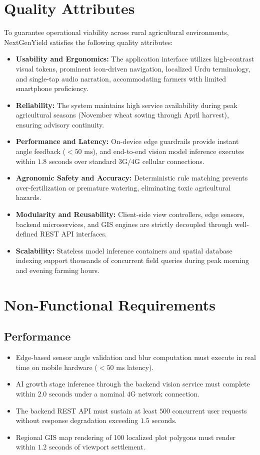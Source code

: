 \documentclass{FastFyp}
\begin{document}
\section{Quality Attributes}
To guarantee operational viability across rural agricultural environments, NextGenYield satisfies the following quality attributes:
\begin{itemize}
    \item \textbf{Usability and Ergonomics:} The application interface utilizes high-contrast visual tokens, prominent icon-driven navigation, localized Urdu terminology, and single-tap audio narration, accommodating farmers with limited smartphone proficiency.
    \item \textbf{Reliability:} The system maintains high service availability during peak agricultural seasons (November wheat sowing through April harvest), ensuring advisory continuity.
    \item \textbf{Performance and Latency:} On-device edge guardrails provide instant angle feedback ($< 50\text{ ms}$), and end-to-end vision model inference executes within $1.8\text{ seconds}$ over standard $3\text{G}/4\text{G}$ cellular connections.
    \item \textbf{Agronomic Safety and Accuracy:} Deterministic rule matching prevents over-fertilization or premature watering, eliminating toxic agricultural hazards.
    \item \textbf{Modularity and Reusability:} Client-side view controllers, edge sensors, backend microservices, and GIS engines are strictly decoupled through well-defined REST API interfaces.
    \item \textbf{Scalability:} Stateless model inference containers and spatial database indexing support thousands of concurrent field queries during peak morning and evening farming hours.
\end{itemize}

\section{Non-Functional Requirements}

\subsection{Performance}
\begin{itemize}
    \item Edge-based sensor angle validation and blur computation must execute in real time on mobile hardware ($< 50\text{ ms}$ latency).
    \item AI growth stage inference through the backend vision service must complete within $2.0\text{ seconds}$ under a nominal $4\text{G}$ network connection.
    \item The backend REST API must sustain at least $500$ concurrent user requests without response degradation exceeding $1.5\text{ seconds}$.
    \item Regional GIS map rendering of 100 localized plot polygons must render within $1.2\text{ seconds}$ of viewport settlement.
\end{itemize}
\end{document}
